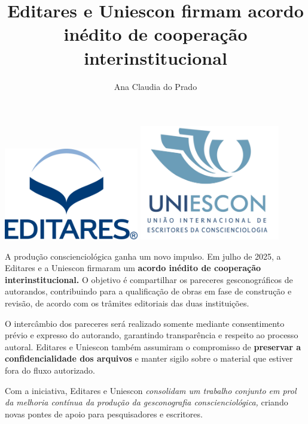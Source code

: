 \documentclass{gescons}
\author{Ana Claudia do Prado}
\title{Editares e Uniescon firmam acordo inédito de cooperação interinstitucional}
\begin{document}
    \makeentrevistatitle


    
    
\begin{center}
    \includegraphics[height=4cm]{images/Logo-Editares-com-Marca-Registrada.png}
    \hspace{3cm}
    \includegraphics[height=5cm]{images/Logo-UNIESCON-2048x1741.png} 
    
\end{center}
    
    \begin{multicols}{2}

A produção conscienciológica ganha um novo impulso. Em julho de 2025, a Editares e a Uniescon firmaram um \textbf{acordo inédito de cooperação interinstitucional.} O objetivo é compartilhar os pareceres gesconográficos de autorandos, contribuindo para a qualificação de obras em fase de construção e revisão, de acordo com os trâmites editoriais das duas instituições.

O intercâmbio dos pareceres será realizado somente mediante consentimento prévio e expresso do autorando, garantindo transparência e respeito ao processo autoral. Editares e Uniescon também assumiram o compromisso de \textbf{preservar a confidencialidade dos arquivos} e manter sigilo sobre o material que estiver fora do fluxo autorizado.

Com a iniciativa, Editares e Uniescon \emph{consolidam um trabalho conjunto em prol da melhoria contínua da produção da gesconografia conscienciológica,} criando novas pontes de apoio para pesquisadores e escritores.



    \end{multicols}
\end{document}
